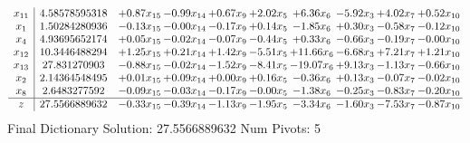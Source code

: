 \documentclass[9pt]{article}
\begin{document}
 \[\begin{array}{c| c c@{\hskip 2pt} c@{\hskip 2pt} c@{\hskip 2pt} c@{\hskip 2pt} c@{\hskip 2pt} c@{\hskip 2pt} c@{\hskip 2pt} c@{\hskip 2pt} }
 x_{11}   &  4.58578595318 & +  0.87 x_{15} & -0.99 x_{14} & +  0.67 x_{9} & +  2.02 x_{5} & +  6.36 x_{6} & -5.92 x_{3} & +  4.02 x_{7} & +  0.52 x_{10}\\
 x_{1}   &  1.50284280936 & -0.13 x_{15} & -0.00 x_{14} & -0.17 x_{9} & +  0.14 x_{5} & -1.85 x_{6} & +  0.30 x_{3} & -0.58 x_{7} & -0.12 x_{10}\\
 x_{4}   &  4.93695652174 & +  0.05 x_{15} & -0.02 x_{14} & -0.07 x_{9} & -0.44 x_{5} & +  0.33 x_{6} & -0.66 x_{3} & -0.19 x_{7} & -0.00 x_{10}\\
 x_{12}   &  10.3446488294 & +  1.25 x_{15} & +  0.21 x_{14} & +  1.42 x_{9} & -5.51 x_{5} & + 11.66 x_{6} & -6.68 x_{3} & +  7.21 x_{7} & +  1.21 x_{10}\\
 x_{13}   &  27.831270903 & -0.88 x_{15} & -0.02 x_{14} & -1.52 x_{9} & -8.41 x_{5} & -19.07 x_{6} & +  9.13 x_{3} & -1.13 x_{7} & -0.66 x_{10}\\
 x_{2}   &  2.14364548495 & +  0.01 x_{15} & +  0.09 x_{14} & +  0.00 x_{9} & +  0.16 x_{5} & -0.36 x_{6} & +  0.13 x_{3} & -0.07 x_{7} & -0.02 x_{10}\\
 x_{8}   &  2.6483277592 & -0.09 x_{15} & -0.03 x_{14} & -0.17 x_{9} & -0.00 x_{5} & -1.38 x_{6} & -0.25 x_{3} & -0.83 x_{7} & -0.20 x_{10}\\
\hline
z    &  27.5566889632 & -0.33 x_{15} & -0.39 x_{14} & -1.13 x_{9} & -1.95 x_{5} & -3.34 x_{6} & -1.60 x_{3} & -7.53 x_{7} & -0.87 x_{10}\\
\end{array}\]
Final Dictionary
Solution:  27.5566889632
Num Pivots:  5
\end{document}
